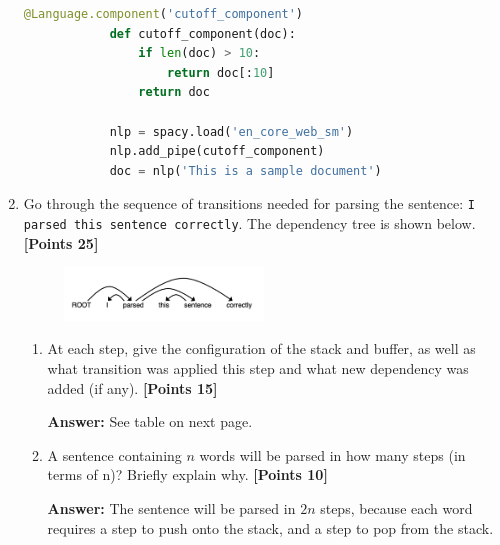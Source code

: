 \documentclass[12pt]{article}
\begin{document}
\begin{enumerate}
\begin{lstlisting}[language=python]
            @Language.component('cutoff_component')
            def cutoff_component(doc):
                if len(doc) > 10:
                    return doc[:10]
                return doc

            nlp = spacy.load('en_core_web_sm')
            nlp.add_pipe(cutoff_component)
            doc = nlp('This is a sample document')
        \end{lstlisting}


    \item Go through the sequence of transitions needed for parsing the sentence:
          \newline
          \verb/I parsed this sentence correctly/.
          \newline
          The dependency tree is shown below. \textbf{[Points 25]}
          \begin{figure}[h]
              \centering
              \includegraphics[width=0.5\textwidth]{assets/hw3/parsetree.png}
          \end{figure}
          \begin{enumerate}
              \item At each step, give the configuration of the stack and
                    buffer, as well as what transition was applied this step and what
                    new dependency was added (if any). \textbf{[Points 15]}

                    \textbf{Answer:} See table on next page.


              \item A sentence containing $n$ words will be parsed in how many
                    steps (in terms of n)? Briefly explain why.
                    \textbf{[Points 10]}

                    \textbf{Answer:} The sentence will be parsed in $2n$ steps,
                    because each word requires a step to push onto the stack,
                    and a step to pop from the stack.

          \end{enumerate}
\end{enumerate}
\end{document}
